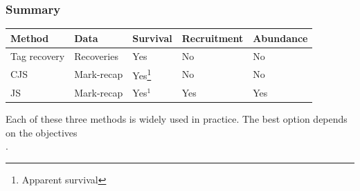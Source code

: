 \documentclass[color=usenames,dvipsnames]{beamer}\usepackage[]{graphicx}\usepackage[]{xcolor}
\begin{document}
\begin{frame}
  \frametitle{Summary}
  \begin{tabular}{lllll}
    \hline
    Method & Data & Survival & Recruitment & Abundance \\
    \hline
    Tag recovery & Recoveries & Yes & No & No \\
    CJS & Mark-recap & Yes\footnote{Apparent survival} & No & No \\
    JS & Mark-recap & Yes$^1$ & Yes & Yes \\
    \hline
  \end{tabular}
  \vfill
  \centering
  Each of these three methods is widely used in practice. The best
  option depends on the objectives \\.
\end{frame}


\end{document}
